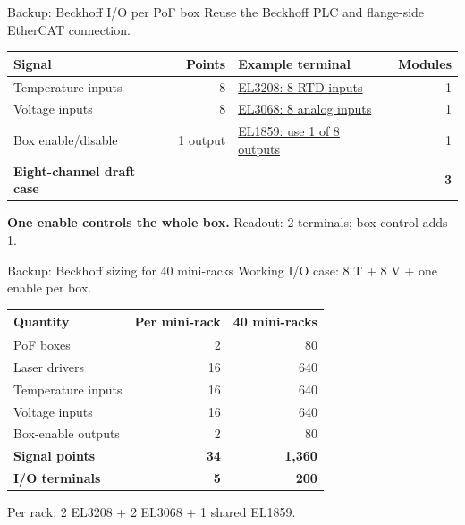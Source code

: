 \documentclass[aspectratio=169,11pt]{beamer}
\begin{document}
\appendix
\begin{frame}{Backup: Beckhoff I/O per PoF box}
  Reuse the Beckhoff PLC and flange-side EtherCAT connection.\par
  \medskip
  {\small
  \renewcommand{\arraystretch}{1.18}
  \begin{tabularx}{\textwidth}{@{}Xr l r@{}}
    \toprule
    Signal & Points & Example terminal & Modules\\
    \midrule
    Temperature inputs & 8 & \href{https://www.beckhoff.com/en-us/products/i-o/ethercat-terminals/el-ed3xxx-analog-input/el3208.html}{EL3208: 8 RTD inputs} & 1\\
    Voltage inputs & 8 & \href{https://www.beckhoff.com/en-us/products/i-o/ethercat-terminals/el-ed3xxx-analog-input/el3068.html}{EL3068: 8 analog inputs} & 1\\
    Box enable/disable & 1 output & \href{https://www.beckhoff.com/en-us/products/i-o/ethercat-terminals/el-ed1xxx-digital-input/el1859.html}{EL1859: use 1 of 8 outputs} & 1\\
    \midrule
    \textbf{Eight-channel draft case} & & & \textbf{3}\\
    \bottomrule
  \end{tabularx}\par}
  \smallskip
  \textbf{One enable controls the whole box.} Readout: 2 terminals; box control adds 1.
\end{frame}

\begin{frame}{Backup: Beckhoff sizing for 40 mini-racks}
  Working I/O case: 8 T + 8 V + one enable per box.\par
  \medskip
  {\small
  \renewcommand{\arraystretch}{1.18}
  \begin{tabularx}{\textwidth}{@{}Xrr@{}}
    \toprule
    Quantity & Per mini-rack & 40 mini-racks\\
    \midrule
    PoF boxes & 2 & 80\\
    Laser drivers & 16 & 640\\
    Temperature inputs & 16 & 640\\
    Voltage inputs & 16 & 640\\
    Box-enable outputs & 2 & 80\\
    \midrule
    \textbf{Signal points} & \textbf{34} & \textbf{1,360}\\
    \textbf{I/O terminals} & \textbf{5} & \textbf{200}\\
    \bottomrule
  \end{tabularx}\par}
  \medskip
  Per rack: 2 EL3208 + 2 EL3068 + 1 shared EL1859.
\end{frame}
\end{document}
